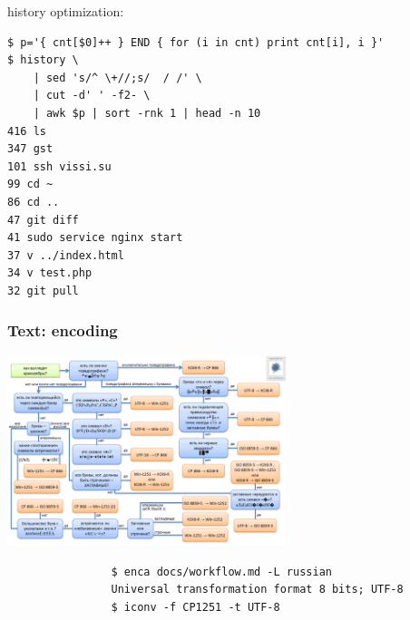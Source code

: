 \documentclass[hyperref={unicode=true}]{beamer}
\begin{document}
\begin{frame}[fragile]
	history optimization:
	\begin{addmargin}[1em]{0em}
		\begin{verbatim}
$ p='{ cnt[$0]++ } END { for (i in cnt) print cnt[i], i }'
$ history \
    | sed 's/^ \+//;s/  / /' \
    | cut -d' ' -f2- \
    | awk $p | sort -rnk 1 | head -n 10
416 ls
347 gst
101 ssh vissi.su 
99 cd ~
86 cd ..
47 git diff 
41 sudo service nginx start
37 v ../index.html
34 v test.php
32 git pull 
		\end{verbatim}
	\end{addmargin}

\end{frame}

\begin{frame}[fragile]
	\frametitle{Text: encoding}
		\begin{center}
			\includegraphics[width=230pt]{encoding.png}
			\vspace{12pt}
			\begin{verbatim}
				$ enca docs/workflow.md -L russian
				Universal transformation format 8 bits; UTF-8
				$ iconv -f CP1251 -t UTF-8
			\end{verbatim}
		\end{center}
\end{frame}
\end{document}
